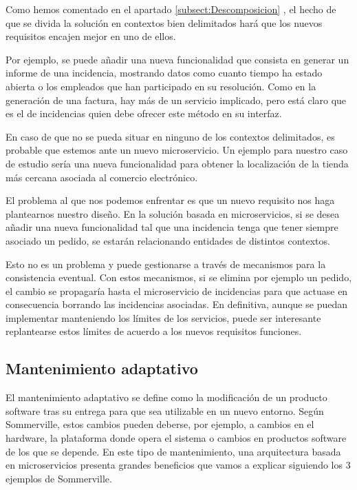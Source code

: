 \documentclass[11pt,spanish,listoffigures]{tfgetsinf}
\begin{document}
Como hemos comentado en el apartado \ref{subsect:Descomposicion} , el hecho de que se divida la solución en contextos bien delimitados hará que los nuevos requisitos encajen mejor en uno de ellos.

Por ejemplo, se puede añadir una nueva funcionalidad que consista en generar un informe de una incidencia, mostrando datos como cuanto tiempo ha estado abierta o los empleados que han participado en su resolución. Como en la generación de una factura, hay más de un servicio implicado, pero está claro que es el de incidencias quien debe ofrecer este método en su interfaz.

En caso de que no se pueda situar en ninguno de los contextos delimitados, es probable que estemos ante un nuevo microservicio. Un ejemplo para nuestro caso de estudio sería una nueva funcionalidad para obtener la localización de la tienda más cercana asociada al comercio electrónico.

El problema al que nos podemos enfrentar es que un nuevo requisito nos haga plantearnos nuestro diseño. En la solución basada en microservicios, si se desea añadir una nueva funcionalidad tal que una incidencia tenga que tener siempre asociado un pedido, se estarán relacionando entidades de distintos contextos. 

Esto no es un problema y puede gestionarse a través de mecanismos para la consistencia eventual. Con estos mecanismos, si se elimina por ejemplo un pedido, el cambio se propagaría hasta el microservicio de incidencias para que actuase en consecuencia borrando las incidencias asociadas. En definitiva, aunque se puedan implementar manteniendo los límites de los servicios, puede ser interesante replantearse estos límites de acuerdo a los nuevos requisitos funciones.

\subsection{Mantenimiento adaptativo}

El mantenimiento adaptativo se define como la modificación de un producto software tras su entrega para que sea utilizable en un nuevo entorno. \cite{Bourque2014} Según Sommerville, estos cambios pueden deberse, por ejemplo, a cambios en el hardware, la plataforma donde opera el sistema o cambios en productos software de los que se depende. \cite{Sommerville2010} En este tipo de mantenimiento, una arquitectura basada en microservicios presenta grandes beneficios que vamos a explicar siguiendo los 3 ejemplos de Sommerville.
\end{document}
